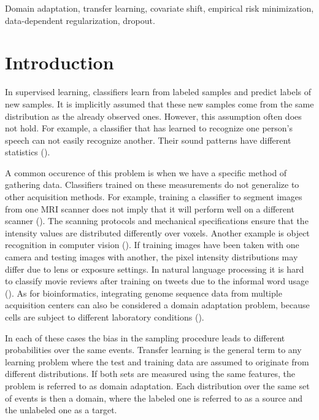 \documentclass[twoside,11pt]{article}
\begin{document}
\begin{keywords}
Domain adaptation, transfer learning, covariate shift, empirical risk minimization, data-dependent regularization, dropout.
\end{keywords}

\section{Introduction}

In supervised learning, classifiers learn from labeled samples and predict labels of new samples. It is implicitly assumed that these new samples come from the same distribution as the already observed ones. However, this assumption often does not hold. For example, a classifier that has learned to recognize one person's speech can not easily recognize another. Their sound patterns have different statistics (\citealp{leggetter1995maximum}). 

A common occurence of this problem is when we have a specific method of gathering data. Classifiers trained on these measurements do not generalize to other acquisition methods. For example, training a classifier to segment images from one MRI scanner does not imply that it will perform well on a different scanner (\citealp{van2013transfer}). The scanning protocols and mechanical specifications ensure that the intensity values are distributed differently over voxels.
Another example is object recognition in computer vision (\citealp{saenko2010adapting}). If training images have been taken with one camera and testing images with another, the pixel intensity distributions may differ due to lens or exposure settings.
In natural language processing it is hard to classify movie reviews after training on tweets due to the informal word usage (\citealp{peddinti2011domain}). As for bioinformatics, integrating genome sequence data from multiple acquisition centers can also be considered a domain adaptation problem, because cells are subject to different laboratory conditions (\citealp{borgwardt2006integrating}). 

In each of these cases the bias in the sampling procedure leads to different probabilities over the same events. Transfer learning is the general term to any learning problem where the test and training data are assumed to originate from different distributions. If both sets are measured using the same features, the problem is referred to as domain adaptation. Each distribution over the same set of events is then a domain, where the labeled one is referred to as a source and the unlabeled one as a target.
\end{document}
